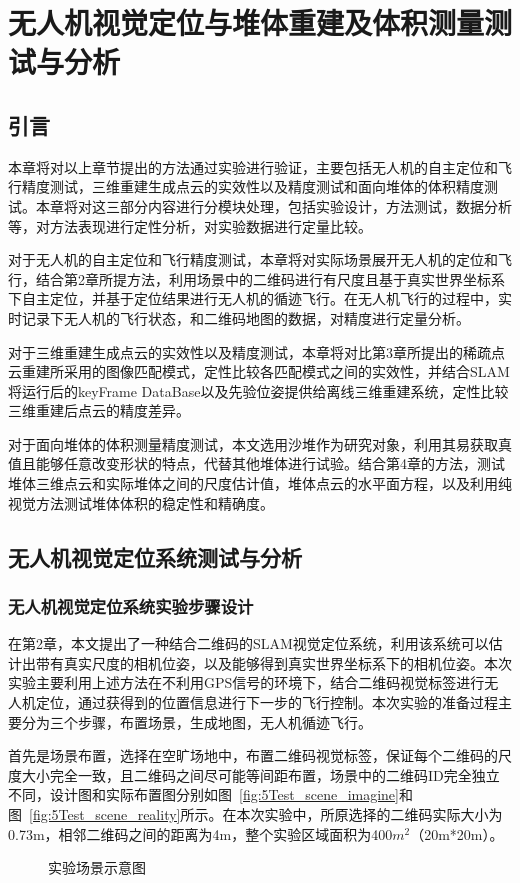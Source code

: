 \chapter{无人机视觉定位与堆体重建及体积测量测试与分析}
\label{cha:chap5}
\section{引言}
\label{sec:5.1}
本章将对以上章节提出的方法通过实验进行验证，主要包括无人机的自主定位和飞行精度测试，三维重建生成点云的实效性以及精度测试和面向堆体的体积精度测试。本章将对这三部分内容进行分模块处理，包括实验设计，方法测试，数据分析等，对方法表现进行定性分析，对实验数据进行定量比较。

对于无人机的自主定位和飞行精度测试，本章将对实际场景展开无人机的定位和飞行，结合第2章所提方法，利用场景中的二维码进行有尺度且基于真实世界坐标系下自主定位，并基于定位结果进行无人机的循迹飞行。在无人机飞行的过程中，实时记录下无人机的飞行状态，和二维码地图的数据，对精度进行定量分析。

对于三维重建生成点云的实效性以及精度测试，本章将对比第3章所提出的稀疏点云重建所采用的图像匹配模式，定性比较各匹配模式之间的实效性，并结合SLAM将运行后的keyFrame DataBase以及先验位姿提供给离线三维重建系统，定性比较三维重建后点云的精度差异。

对于面向堆体的体积测量精度测试，本文选用沙堆作为研究对象，利用其易获取真值且能够任意改变形状的特点，代替其他堆体进行试验。结合第4章的方法，测试堆体三维点云和实际堆体之间的尺度估计值，堆体点云的水平面方程，以及利用纯视觉方法测试堆体体积的稳定性和精确度。
\section{无人机视觉定位系统测试与分析}
\label{sec:5.2}
\subsection{无人机视觉定位系统实验步骤设计}
\label{sec:5.2.1}
在第2章，本文提出了一种结合二维码的SLAM视觉定位系统，利用该系统可以估计出带有真实尺度的相机位姿，以及能够得到真实世界坐标系下的相机位姿。本次实验主要利用上述方法在不利用GPS信号的环境下，结合二维码视觉标签进行无人机定位，通过获得到的位置信息进行下一步的飞行控制。本次实验的准备过程主要分为三个步骤，布置场景，生成地图，无人机循迹飞行。

首先是场景布置，选择在空旷场地中，布置二维码视觉标签，保证每个二维码的尺度大小完全一致，且二维码之间尽可能等间距布置，场景中的二维码ID完全独立不同，设计图和实际布置图分别如图~\ref{fig:5Test_scene_imagine}和图~\ref{fig:5Test_scene_reality}所示。在本次实验中，所原选择的二维码实际大小为0.73m，相邻二维码之间的距离为4m，整个实验区域面积为400$m^2$（20m*20m）。
\begin{figure}[H]
  \centering%
  \hspace{4em}%
  \caption{实验场景示意图}
  \label{fig:scene}
\end{figure}

